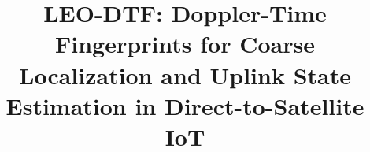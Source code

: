 \documentclass[conference]{IEEEtran}
\begin{document}
\title{LEO-DTF: Doppler-Time Fingerprints for Coarse Localization and Uplink State Estimation in Direct-to-Satellite IoT}

\author{
}

\maketitle














\end{document}

